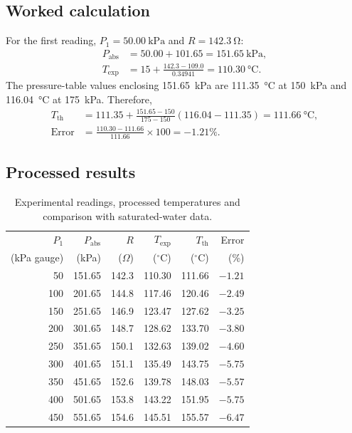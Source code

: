 \documentclass[11pt,a4paper]{article}
\begin{document}
\subsection{Worked calculation}
For the first reading, $P_1=\SI{50.00}{\kilo\pascal}$ and
$R=\SI{142.3}{\ohm}$:
\begin{align}
  P_{\mathrm{abs}} &= 50.00+101.65
  =\SI{151.65}{\kilo\pascal},\\
  T_{\mathrm{exp}} &= 15+\frac{142.3-109.0}{0.34941}
  =\SI{110.30}{\degreeCelsius}.
\end{align}
The pressure-table values enclosing \SI{151.65}{\kilo\pascal} are
\SI{111.35}{\degreeCelsius} at \SI{150}{\kilo\pascal} and
\SI{116.04}{\degreeCelsius} at \SI{175}{\kilo\pascal}. Therefore,
\begin{align}
  T_{\mathrm{th}}
    &=111.35+\frac{151.65-150}{175-150}(116.04-111.35)
      =\SI{111.66}{\degreeCelsius},\\
  \mathrm{Error}
    &=\frac{110.30-111.66}{111.66}\times100=-1.21\%.
\end{align}

\subsection{Processed results}
\begin{table}[H]
  \centering
  \caption{Experimental readings, processed temperatures and comparison with
  saturated-water data.}
  \label{tab:results}
  \small
  \begin{tabular}{rrrrrr}
    \toprule
    $P_1$ & $P_{\mathrm{abs}}$ & $R$ & $T_{\mathrm{exp}}$ & $T_{\mathrm{th}}$ & Error \\
    (kPa gauge) & (kPa) & ($\Omega$) & ($^\circ$C) & ($^\circ$C) & (\%) \\
    \midrule
     50 & 151.65 & 142.3 & 110.30 & 111.66 & $-1.21$ \\
    100 & 201.65 & 144.8 & 117.46 & 120.46 & $-2.49$ \\
    150 & 251.65 & 146.9 & 123.47 & 127.62 & $-3.25$ \\
    200 & 301.65 & 148.7 & 128.62 & 133.70 & $-3.80$ \\
    250 & 351.65 & 150.1 & 132.63 & 139.02 & $-4.60$ \\
    300 & 401.65 & 151.1 & 135.49 & 143.75 & $-5.75$ \\
    350 & 451.65 & 152.6 & 139.78 & 148.03 & $-5.57$ \\
    400 & 501.65 & 153.8 & 143.22 & 151.95 & $-5.75$ \\
    450 & 551.65 & 154.6 & 145.51 & 155.57 & $-6.47$ \\
    \bottomrule
  \end{tabular}
\end{table}
\end{document}
